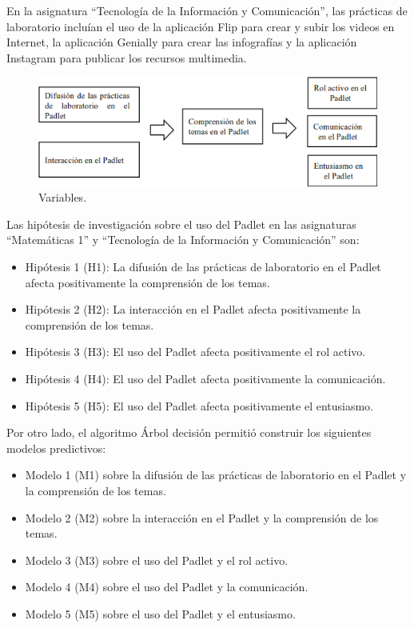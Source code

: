 \documentclass[spanish]{textolivre}
\begin{document}
En la asignatura “Tecnología de la Información y Comunicación”, las prácticas de laboratorio incluían el uso de la aplicación Flip para crear y subir los videos en Internet, la aplicación Genially para crear las infografías y la aplicación Instagram para publicar los recursos multimedia. 

\begin{figure}[h]
\centering
\begin{minipage}{.85\textwidth}
    \includegraphics[width=\linewidth]{Fig1.png}
    \caption{Variables.}
    \label{fig1}
\end{minipage}
\end{figure}

Las hipótesis de investigación sobre el uso del Padlet en las asignaturas “Matemáticas 1” y “Tecnología de la Información y Comunicación” son:

\begin{itemize}
    \item Hipótesis 1 (H1): La difusión de las prácticas de laboratorio en el Padlet afecta positivamente la comprensión de los temas.
    \item Hipótesis 2 (H2): La interacción en el Padlet afecta positivamente la comprensión de los temas.
    \item Hipótesis 3 (H3): El uso del Padlet afecta positivamente el rol activo.
    \item Hipótesis 4 (H4): El uso del Padlet afecta positivamente la comunicación.
    \item Hipótesis 5 (H5): El uso del Padlet afecta positivamente el entusiasmo.
\end{itemize}

Por otro lado, el algoritmo Árbol decisión permitió construir los siguientes modelos predictivos:

\begin{itemize}
    \item Modelo 1 (M1) sobre la difusión de las prácticas de laboratorio en el Padlet y la comprensión de los temas.
    \item Modelo 2 (M2) sobre la interacción en el Padlet y la comprensión de los temas.
    \item Modelo 3 (M3) sobre el uso del Padlet y el rol activo.
    \item Modelo 4 (M4) sobre el uso del Padlet y la comunicación.
    \item Modelo 5 (M5) sobre el uso del Padlet y el entusiasmo.
\end{itemize}
\end{document}
